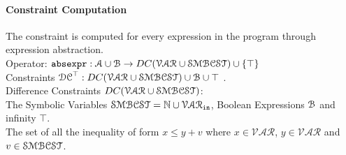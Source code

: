 \paragraph{Constraint Computation}
The constraint is computed for every expression in the program through expression abstraction.
\\
Operator: $\mathtt{abs}{\mathtt{expr}} : \mathcal{A} \cup \mathcal{B} \to DC(\mathcal{VAR}  \cup \mathcal{SMBCST}) \cup \{\top\}$
\\
Constraints $\mathcal{DC}^{\top}: DC(\mathcal{VAR}  \cup \mathcal{SMBCST}) \cup \mathcal{B} \cup \top$ .
\\
Difference Constraints $DC(\mathcal{VAR}  \cup \mathcal{SMBCST})$: 
\\
The Symbolic Variables $\mathcal{SMBCST} = \mathbb{N} \cup \mathcal{VAR}_{\mathtt{in}}$, Boolean Expressions $\mathcal{B}$ and infinity $\top$.
\\
The set of all the inequality of form $x \leq y + v$ where $x \in \mathcal{VAR} $, 
$y \in \mathcal{VAR}$ and $v \in \mathcal{SMBCST}$.
\\


